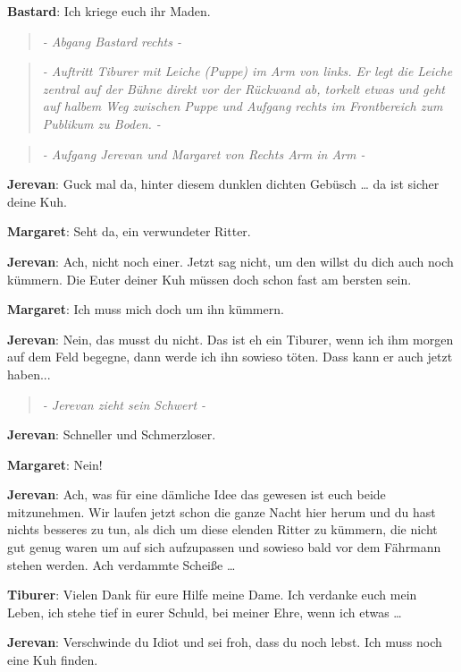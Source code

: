 \documentclass[a5paper,6pt]{book}
\begin{document}
\textbf{Bastard}: Ich kriege euch ihr Maden.


\begin{quote}
  \textit{- Abgang Bastard rechts -
}
 \end{quote}

\begin{quote}
  \textit{- Auftritt Tiburer mit Leiche (Puppe) im Arm von links. Er legt die Leiche zentral auf der Bühne direkt vor der Rückwand ab, torkelt etwas und geht auf halbem Weg zwischen Puppe und Aufgang rechts im Frontbereich zum Publikum zu Boden. -
}
 \end{quote}

\begin{quote}
  \textit{- Aufgang Jerevan und Margaret von Rechts Arm in Arm -
}
 \end{quote}

\textbf{Jerevan}: Guck mal da, hinter diesem dunklen dichten Gebüsch … da ist sicher deine Kuh.

\textbf{Margaret}: Seht da, ein verwundeter Ritter.

\textbf{Jerevan}: Ach, nicht noch einer. Jetzt sag nicht, um den willst du dich auch noch kümmern. Die Euter deiner Kuh müssen doch schon fast am bersten sein.

\textbf{Margaret}: Ich muss mich doch um ihn kümmern.

\textbf{Jerevan}: Nein, das musst du nicht. Das ist eh ein Tiburer, wenn ich ihm morgen auf dem Feld begegne, dann werde ich ihn sowieso töten. Dass kann er auch jetzt haben...

\begin{quote}
  \textit{- Jerevan zieht sein Schwert -
}
 \end{quote}


\textbf{Jerevan}: Schneller und Schmerzloser.

\textbf{Margaret}: Nein!

\textbf{Jerevan}: Ach, was für eine dämliche Idee das gewesen ist euch beide mitzunehmen. Wir laufen jetzt schon die ganze Nacht hier herum und du hast nichts besseres zu tun, als dich um diese elenden Ritter zu kümmern, die nicht gut genug waren um auf sich aufzupassen und sowieso bald vor dem Fährmann stehen werden. Ach verdammte Scheiße …

\textbf{Tiburer}: Vielen Dank für eure Hilfe meine Dame. Ich verdanke euch mein Leben, ich stehe tief in eurer Schuld, bei meiner Ehre, wenn ich etwas …

\textbf{Jerevan}: Verschwinde du Idiot und sei froh, dass du noch lebst. Ich muss noch eine Kuh finden.
\end{document}
